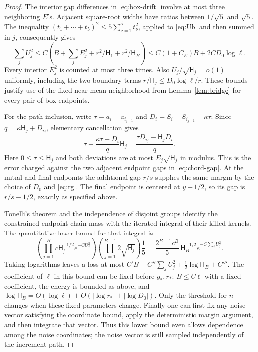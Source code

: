 \documentclass[11pt]{article}
\theoremstyle{definition}\newtheorem{definition}[theorem]{Definition}
\theoremstyle{remark}\newtheorem{remark}[theorem]{Remark}
\numberwithin{equation}{section}\allowdisplaybreaks
\begin{document}
\begin{proof}
The interior gap differences in \eqref{eq:box-drift} involve at
most three neighboring $E$'s. Adjacent square-root widths have
ratios between $1/\sqrt5$ and $\sqrt5$. The inequality
$(t_1+\cdots+t_5)^2\le5\sum_{\nu=1}^5t_\nu^2$, applied to
\eqref{eq:Ub} and then summed in $j$, consequently gives
\[
 \sum_jU_j^2
 \le C\left(B+\sum_jE_j^2+
                     r^2/\mathsf H_1+r^2/\mathsf H_B\right)
 \le C(1+C_E)B+2CD_0\log\ell.
\]
Every interior $E_j^2$ is counted at most three times. Also
$U_j/\sqrt{\mathsf H_j}=o(1)$ uniformly, including the two
boundary terms $r/\mathsf H_j\le D_0\log\ell/r$. These bounds
justify use of the fixed near-mean neighborhood from
Lemma~\ref{lem:bridge} for every pair of box endpoints.

For the path inclusion, write
$\tau=a_i-a_{i_{j-1}}$ and $D_i=S_i-S_{i_{j-1}}-\kappa\tau$.
Since $q=\kappa\mathsf H_j+D_{i_j}$, elementary cancellation gives
\[
 \tau-\frac{\kappa\tau+D_i}{q}\mathsf H_j
   =\frac{\tau D_{i_j}-\mathsf H_jD_i}{q}.
\]
Here $0\le\tau\le\mathsf H_j$ and both deviations are at most
$E_j\sqrt{\mathsf H_j}$ in modulus. This is the error charged
against the two adjacent endpoint gaps in \eqref{eq:chord-gap}.
At the initial and final endpoints the additional gap $r/s$
supplies the same margin by the choice of $D_0$ and \eqref{eq:rg}.
The final endpoint is centered at $y+1/2$, so its gap is
$r/s-1/2$, exactly as specified above.

Tonelli's theorem and the independence of disjoint groups identify
the constrained endpoint-chain mass with the iterated integral
of their killed kernels. The quantitative lower bound for that
integral is
\[
 \left(\prod_{j=1}^B c\mathsf H_j^{-1/2}e^{-CU_j^2}\right)
 \left(\prod_{j=1}^{B-1}2\sqrt{\mathsf H_j}\right)\frac15
 =\frac{2^{B-1}c^B}{5}\,
       \mathsf H_B^{-1/2}e^{-C\sum_jU_j^2}.
\]
Taking logarithms leaves a loss at most
$C'B+C''\sum_jU_j^2+\tfrac12\log\mathsf H_B+C'''$.
The coefficient of $\ell$ in this bound can be fixed before
$g_*,r_*$: $B\le C\ell$ with a fixed coefficient, the energy is
bounded as above, and
$\log\mathsf H_B=O(\log\ell)+O(|\log r_*|+|\log D_0|)$.
Only the threshold for $n$ changes when these fixed parameters
change. Finally one can first fix any noise vector satisfying
the coordinate bound, apply the deterministic margin argument,
and then integrate that vector. Thus this lower bound even
allows dependence among the noise coordinates; the noise vector
is still sampled independently of the increment path.

\end{proof}
\end{document}
